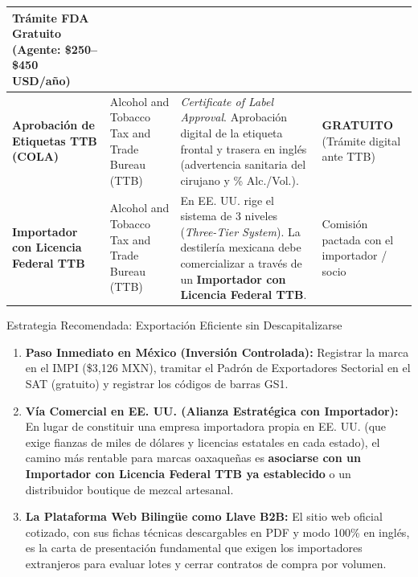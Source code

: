 \documentclass[11pt,letterpaper]{article}
\begin{document}
\begin{tabularx}{\textwidth}{>{\bfseries}p{2.8cm} p{2.8cm} X >{\raggedleft\arraybackslash}p{2.8cm}}
Trámite FDA Gratuito (Agente: \$250–\$450 USD/año) \\
\midrule
Aprobación de Etiquetas TTB (COLA) & 
Alcohol and Tobacco Tax and Trade Bureau (TTB) & 
\textit{Certificate of Label Approval}. Aprobación digital de la etiqueta frontal y trasera en inglés (advertencia sanitaria del cirujano y \% Alc./Vol.). & 
\textbf{GRATUITO} (Trámite digital ante TTB) \\
\midrule
Importador con Licencia Federal TTB & 
Alcohol and Tobacco Tax and Trade Bureau (TTB) & 
En EE. UU. rige el sistema de 3 niveles (\textit{Three-Tier System}). La destilería mexicana debe comercializar a través de un \textbf{Importador con Licencia Federal TTB}. & 
Comisión pactada con el importador / socio \\
\bottomrule
\end{tabularx}

\vspace{0.3cm}

\begin{infobox}{Estrategia Recomendada: Exportación Eficiente sin Descapitalizarse}
\footnotesize
\begin{enumerate}[leftmargin=0.9cm,topsep=1.5pt,itemsep=2pt]
    \item \textbf{Paso Inmediato en México (Inversión Controlada):} Registrar la marca en el IMPI (\$3,126 MXN), tramitar el Padrón de Exportadores Sectorial en el SAT (gratuito) y registrar los códigos de barras GS1.
    \item \textbf{Vía Comercial en EE. UU. (Alianza Estratégica con Importador):} En lugar de constituir una empresa importadora propia en EE. UU. (que exige fianzas de miles de dólares y licencias estatales en cada estado), el camino más rentable para marcas oaxaqueñas es \textbf{asociarse con un Importador con Licencia Federal TTB ya establecido} o un distribuidor boutique de mezcal artesanal.
    \item \textbf{La Plataforma Web Bilingüe como Llave B2B:} El sitio web oficial cotizado, con sus fichas técnicas descargables en PDF y modo 100\% en inglés, es la carta de presentación fundamental que exigen los importadores extranjeros para evaluar lotes y cerrar contratos de compra por volumen.
\end{enumerate}
\end{infobox}

\clearpage

\end{document}
